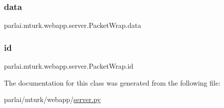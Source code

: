\subsubsection{\texorpdfstring{data}{data}}
{\footnotesize\ttfamily parlai.\+mturk.\+webapp.\+server.\+Packet\+Wrap.\+data}

\mbox{\label{classparlai_1_1mturk_1_1webapp_1_1server_1_1PacketWrap_a588c6f6a5e15b3eb32e497483d22e7e3}} 
\subsubsection{\texorpdfstring{id}{id}}
{\footnotesize\ttfamily parlai.\+mturk.\+webapp.\+server.\+Packet\+Wrap.\+id}



The documentation for this class was generated from the following file\+:\begin{DoxyCompactItemize}
\item 
parlai/mturk/webapp/\hyperlink{server_8py}{server.\+py}\end{DoxyCompactItemize}
